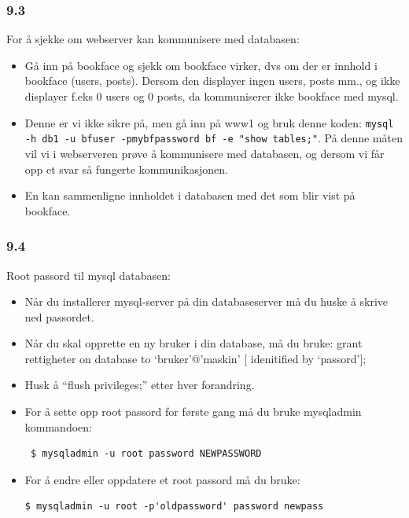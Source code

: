\documentclass[a4paper, norsk, 12pt]{article}
\begin{document}
\subsubsection*{9.3} For å sjekke om webserver kan kommunisere med databasen:
\begin{itemize}
\item Gå inn på bookface og sjekk om bookface virker, dvs om der er innhold i bookface (users, posts). Dersom den displayer ingen users, posts mm., og ikke displayer f.eks 0 users og 0 posts, da kommuniserer ikke bookface med mysql.

\item Denne er vi ikke sikre på, men gå inn på www1 og bruk denne koden: \texttt{mysql -h db1 -u bfuser -pmybfpassword bf -e "show tables;"}. På denne måten vil vi i webserveren prøve å kommunisere med databasen, og dersom vi får opp et svar så fungerte kommunikasjonen.

\item En kan sammenligne innholdet i databasen med det som blir vist på bookface.
\end{itemize}
\subsubsection*{9.4}Root passord til mysql databasen:
\begin{itemize}
\item Når du installerer mysql-server på din databaseserver må du huske å skrive ned passordet.

\item Når du skal opprette en ny bruker i din database, må du bruke: grant rettigheter on database to ‘bruker’@’maskin’ [ idenitified by ‘passord’];

\item Husk å “flush privileges;” etter hver forandring.

\item For å sette opp root passord for første gang må du bruke mysqladmin kommandoen: \hspace*{\fill} \\[-\dimexpr\baselineskip+\parskip\relax]
\begin{verbatim}
 $ mysqladmin -u root password NEWPASSWORD
\end{verbatim}

\item For å endre eller oppdatere et root passord må du bruke: \hspace*{\fill} \\[-\dimexpr\baselineskip+\parskip\relax] %
\begin{verbatim}
$ mysqladmin -u root -p'oldpassword' password newpass
\end{verbatim}
\end{itemize}
\end{document}
